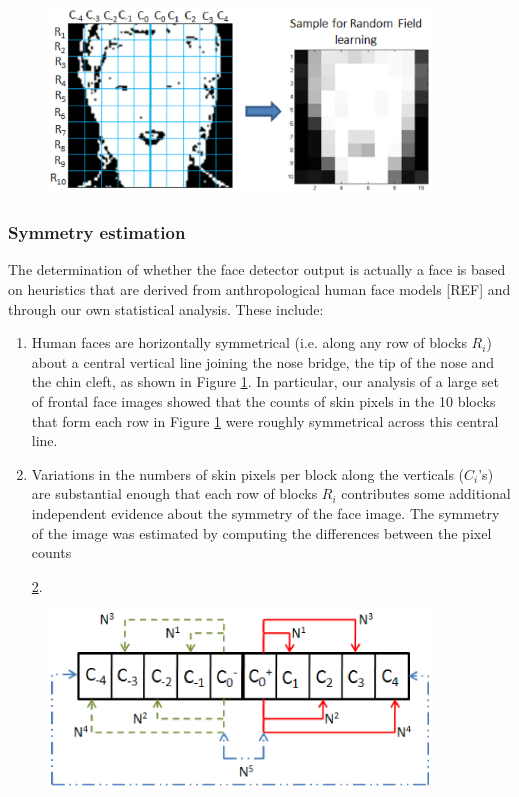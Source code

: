 \documentclass[times, 10pt,twocolumn]{article}
\begin{document}
\begin{figure}[h]
\hspace{-0.3in}
\includegraphics[width=4in]{Figure7.eps} \caption{{\bf
{\selectfont }}} \label{Fig:RowColumnBlocks}
\end{figure}

\subsubsection{Symmetry estimation}\label{Symmetry}The determination of whether the
face detector output is actually a face is based on heuristics that are derived from anthropological human face
models [REF] and through our own statistical analysis. These include:
\begin{enumerate}
\item Human faces are horizontally symmetrical (i.e. along any row of blocks $R_i$)
about a  central vertical line joining the nose bridge, the tip of the nose and the chin cleft, as
shown in Figure \ref{Fig:RowColumnBlocks}.  In particular, our analysis of a large set
of frontal face images showed that the counts of skin pixels
in the 10 blocks that form
each row in Figure \ref{Fig:RowColumnBlocks}
were roughly symmetrical across this central line.
\item Variations in the numbers of skin pixels per block along the verticals ($C_i$'s) are substantial enough that
each row of blocks $R_i$ contributes some additional independent evidence about the symmetry of the face image.
The symmetry of the image was estimated by computing the differences between
the pixel counts

\ref{Fig:Neighborhood}.
\end{enumerate}

\begin{figure}[h]
\hspace{-0.3in}
\includegraphics[width=4in]{Figure8.eps} \caption{{\bf
{\selectfont }}} \label{Fig:Neighborhood}
\end{figure}
\end{document}
